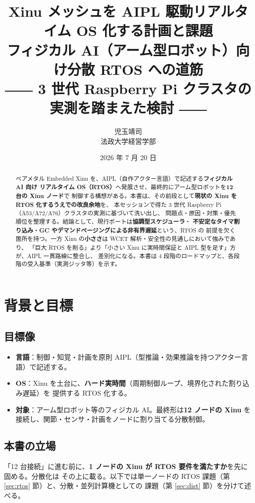 \documentclass[11pt,a4paper]{article}
\title{\textbf{Xinu メッシュを AIPL 駆動リアルタイム OS 化する計画と課題}\\[2mm]
  \large フィジカル AI（アーム型ロボット）向け分散 RTOS への道筋\\[1mm]
  \normalsize ―― 3 世代 Raspberry Pi クラスタの実測を踏まえた検討 ――}
\author{児玉靖司\\\small 法政大学経営学部}
\date{2026 年 7 月 20 日}
\begin{document}
\maketitle

\begin{abstract}
\noindent
ベアメタル Embedded Xinu を、AIPL（自作アクター言語）で記述する\textbf{フィジカル AI 向け
リアルタイム OS（RTOS）}へ発展させ、最終的にアーム型ロボットを\textbf{12 台の Xinu ノード}で
制御する構想がある。本書は、その前段として\textbf{現状の Xinu を RTOS 化するうえでの改良余地}を、
本セッションで得た 3 世代 Raspberry Pi（A53/A72/A76）クラスタの実測に基づいて洗い出し、
問題点・原因・対策・優先順位を整理する。結論として、現行ポートは\textbf{協調型スケジューラ}・
\textbf{不安定なタイマ割り込み}・\textbf{GC やデマンドページングによる非有界遅延}という、RTOS の
前提を欠く箇所を持つ。一方 Xinu の\textbf{小ささ}は WCET 解析・安全性の見通しにおいて強みであり、
「巨大 RTOS を削る」より「小さい Xinu に実時間保証と AIPL 型を足す」方が、AIPL 一貫路線に整合し、
差別化になる。本書は 4 段階のロードマップと、各段階の受入基準（実測ジッタ等）を示す。
\end{abstract}

\tableofcontents
\newpage

\section{背景と目標}

\subsection{目標像}
\begin{itemize}[leftmargin=1.4em,noitemsep]
  \item \textbf{言語}：制御・知覚・計画を原則 AIPL（型推論・効果推論を持つアクター言語）で記述する。
  \item \textbf{OS}：Xinu を土台に、\textbf{ハード実時間}（周期制御ループ、境界化された割り込み遅延）を
        提供する RTOS 化する。
  \item \textbf{対象}：アーム型ロボット等のフィジカル AI。最終形は\textbf{12 ノードの Xinu} を
        接続し、関節・センサ・計画をノードに割り当てる分散制御。
\end{itemize}

\subsection{本書の立場}
「12 台接続」に進む前に、\textbf{1 ノードの Xinu が RTOS 要件を満たすか}を先に固める。分散化は
その上に載る。以下では単一ノードの RTOS 課題（第 \ref{sec:rtos} 節）と、分散・並列計算機としての
課題（第 \ref{sec:dist} 節）を分けて述べる。
\end{document}
